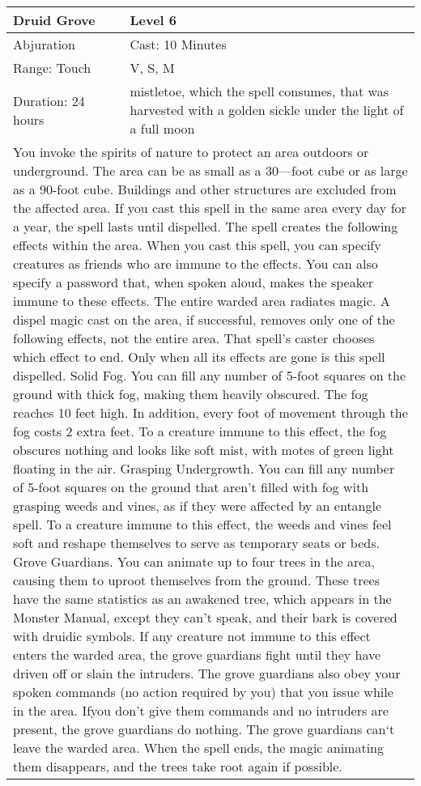 \documentclass[11pt]{report}
\begin{document}
\begin{table}[H]
	\begin{tabular}{||p{6cm}|p{6cm}||}
		\hline\hline
		\bf{Druid Grove} & Level 6\\ \hline
		Abjuration & Cast: 10 Minutes\\ \hline
		Range: Touch & V, S, M\\ \hline
		Duration: 24 hours & mistletoe, which the spell consumes, that was harvested with a golden sickle under the light of a full moon\\ \hline
		\multicolumn{2}{||p{12cm}||}{You invoke the spirits of nature to protect an area outdoors or underground. The area can be as small as a 30—foot cube or as large as a 90-foot cube. Buildings and other structures are excluded from the affected area. If you cast this spell in the same area every day for a year, the spell lasts until dispelled. The spell creates the following effects within the area. When you cast this spell, you can specify creatures as friends who are immune to the effects. You can also specify a password that, when spoken aloud, makes the speaker immune to these effects. The entire warded area radiates magic. A dispel magic cast on the area, if successful, removes only one of the following effects, not the entire area. That spell’s caster chooses which effect to end. Only when all its effects are gone is this spell dispelled.
Solid Fog. You can fill any number of 5-foot squares on the ground with thick fog, making them heavily obscured. The fog reaches 10 feet high. In addition, every foot of movement through the fog costs 2 extra feet. To a creature immune to this effect, the fog obscures nothing and looks like soft mist, with motes of green light floating in the air.
Grasping Undergrowth. You can fill any number of 5-foot squares on the ground that aren’t filled with fog with grasping weeds and vines, as if they were affected by an entangle spell. To a creature immune to this effect, the weeds and vines feel soft and reshape themselves to serve as temporary seats or beds.
Grove Guardians. You can animate up to four trees in the area, causing them to uproot themselves from the ground. These trees have the same statistics as an awakened tree, which appears in the Monster Manual, except they can’t speak, and their bark is covered with druidic symbols. If any creature not immune to this effect enters the warded area, the grove guardians fight until they have driven off or slain the intruders. The grove guardians also obey your spoken commands (no action required by you) that you issue while in the area. Ifyou don't give them commands and no intruders are present, the grove guardians do nothing. The grove guardians can‘t leave the warded area. When the spell ends, the magic animating them disappears, and the trees take root again if possible.
}
\end{tabular}
\end{table}
\end{document}

